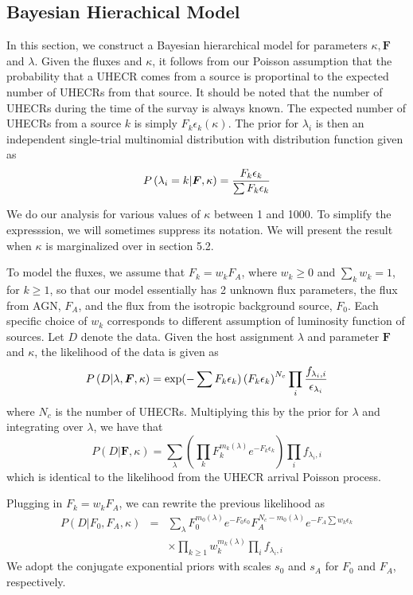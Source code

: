 \documentclass[dvips,aoas]{imsart}
\newcommand{\be}{\begin{equation}}
\newcommand{\ee}{\end{equation}}
\newcommand{\ba}{\begin{eqnarray}}
\newcommand{\ea}{\end{eqnarray}}
\begin{document}
\subsection{Bayesian Hierachical Model}
In this section, we construct a Bayesian hierarchical model for parameters $\kappa,\boldsymbol{F}$ and $\lambda$.
Given the fluxes and $\kappa$, it follows from our Poisson assumption that the probability
that a UHECR comes from a source is proportinal to the expected number of UHECRs from
that source. It should be noted that the number of UHECRs during the time of the survay
is always known. The expected number of UHECRs from a source $k$ is simply $F_k\epsilon_k(\kappa)$.
The prior for $\lambda_i$ is then an independent single-trial multinomial distribution with
distribution function given as
\be
P\left(\lambda_i=k|\boldsymbol{F},\kappa\right) = {F_k\epsilon_k\over \sum F_k\epsilon_k }
\ee

We do our analysis for various values of $\kappa$ between 1 and 1000. To simplify the expresssion,
we will sometimes suppress its notation. We will present the result when $\kappa$ is marginalized
over in section 5.2.

To model the fluxes, we assume that $F_k = w_kF_A$, where $w_k \geq 0$ and $\sum_k w_k = 1$,
for $k\geq 1$, so that our model essentially has 2 unknown flux parameters, the flux from AGN, $F_A$,
and the flux from the isotropic background source, $F_0$. Each specific choice of $w_k$ corresponds
to different assumption of luminosity function of sources.
Let $D$ denote the data. Given the host assignment $\lambda$ and parameter $\boldsymbol{F}$ and $\kappa$,
the likelihood of the data is given as
\be
P\left(D|\lambda,\boldsymbol{F},\kappa\right)=\exp(-\sum F_k\epsilon_k)\left(F_k\epsilon_k\right)^{N_c} \prod_i {f_{\lambda_i,i}\over\epsilon_{\lambda_i}}
\ee
where $N_c$ is the number of UHECRs. Multiplying this by the prior for $\lambda$ and integrating over $\lambda$,
we have that
\be
P\left(D|\boldsymbol{F},\kappa\right) = \sum_{\lambda}\left(\prod_k F_k^{m_k(\lambda)}e^{-F_k\epsilon_k}\right) \prod_i f_{\lambda_i,i}
\ee
which is identical to the likelihood from the UHECR arrival Poisson process.

Plugging in $F_k = w_kF_A$, we can rewrite the previous likelihood as
\ba \label{eq:lik}
P\left(D|F_0,F_A,\kappa\right) &=& \sum_{\lambda} F_0^{m_0(\lambda)}e^{-F_0\epsilon_0} F_A^{N_c-m_0(\lambda)}e^{-F_A\sum w_k\epsilon_k}\nonumber\\
& & \times\prod_{k\geq 1}w_k ^{m_k(\lambda)} \prod_i f_{\lambda_i,i}
\ea
We adopt the conjugate exponential priors with scales $s_0$ and $s_A$ for $F_0$ and $F_A$, respectively.
\end{document}
